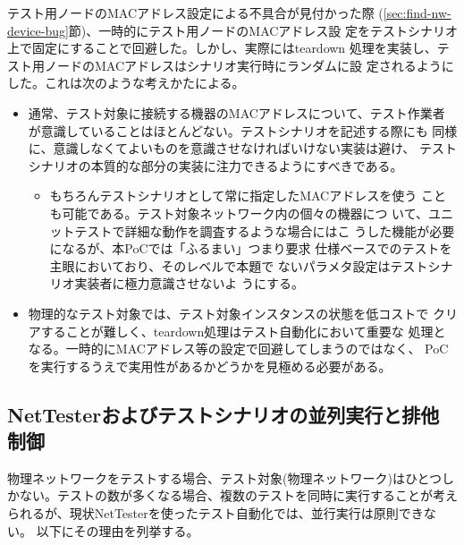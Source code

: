 テスト用ノードのMACアドレス設定による不具合が見付かった際
(\ref{sec:find-nw-device-bug}節)、一時的にテスト用ノードのMACアドレス設
定をテストシナリオ上で固定にすることで回避した。しかし、実際にはteardown
処理を実装し、テスト用ノードのMACアドレスはシナリオ実行時にランダムに設
定されるようにした。これは次のような考えかたによる。
\begin{itemize}
 \item 通常、テスト対象に接続する機器のMACアドレスについて、テスト作業者
       が意識していることはほとんどない。テストシナリオを記述する際にも
       同様に、意識しなくてよいものを意識させなければいけない実装は避け、
       テストシナリオの本質的な部分の実装に注力できるようにすべきである。
       \begin{itemize}
        \item もちろんテストシナリオとして常に指定したMACアドレスを使う
              ことも可能である。テスト対象ネットワーク内の個々の機器につ
              いて、ユニットテストで詳細な動作を調査するような場合にはこ
              うした機能が必要になるが、本PoCでは「ふるまい」つまり要求
              仕様ベースでのテストを主眼においており、そのレベルで本題で
              ないパラメタ設定はテストシナリオ実装者に極力意識させないよ
              うにする。
       \end{itemize}
 \item 物理的なテスト対象では、テスト対象インスタンスの状態を低コストで
       クリアすることが難しく、teardown処理はテスト自動化において重要な
       処理となる。一時的にMACアドレス等の設定で回避してしまうのではなく、
       PoCを実行するうえで実用性があるかどうかを見極める必要がある。
\end{itemize}

  \subsection{NetTesterおよびテストシナリオの並列実行と排他制御}
  \label{sec:testscenario-excl-ctrl}

物理ネットワークをテストする場合、テスト対象(物理ネットワーク)はひとつし
かない。テストの数が多くなる場合、複数のテストを同時に実行することが考え
られるが、現状NetTesterを使ったテスト自動化では、並行実行は原則できない。
以下にその理由を列挙する。


